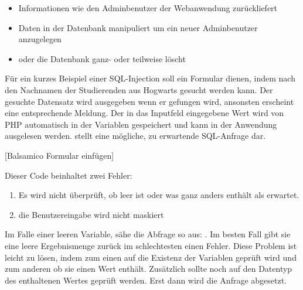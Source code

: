 \begin{itemize}
	\item Informationen wie den Adminbenutzer der Webanwendung zurückliefert
	\item Daten in der Datenbank manipuliert um ein neuer Adminbenutzer anzugelegen
	\item oder die Datenbank ganz- oder teilweise löscht
\end{itemize}

Für ein kurzes Beispiel einer SQL-Injection soll ein Formular dienen, indem nach den Nachnamen der Studierenden aus Hogwarts gesucht werden kann. Der gesuchte  Datensatz wird ausgegeben wenn er gefungen wird, ansonsten erscheint eine entsprechende Meldung. Der in das Inputfeld eingegebene Wert wird von PHP automatisch in der Variablen  gespeichert und kann in der Anwendung ausgelesen werden.  stellt eine mögliche, zu erwartende SQL-Anfrage dar.

[Balsamico Formular einfügen]


Dieser Code beinhaltet zwei Fehler:

\begin{enumerate}
	\item Es wird nicht überprüft, ob  leer ist oder was ganz anders enthält als erwartet.
	\item die Benutzereingabe wird nicht maskiert
\end{enumerate}

Im Falle einer leeren Variable, sähe die Abfrage so aus: . Im besten Fall gibt sie eine leere Ergebnismenge zurück im schlechtesten einen Fehler. Diese Problem ist leicht zu lösen, indem zum einen auf die Existenz der Variablen geprüft wird und zum anderen ob sie einen Wert enthält. Zusätzlich sollte noch auf den Datentyp des enthaltenen Wertes geprüft werden. Erst dann wird die Anfrage abgesetzt.

